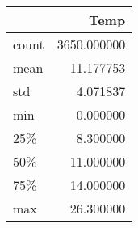 \begin{tabular}{lr}
\toprule
{} &         Temp \\
\midrule
count &  3650.000000 \\
mean  &    11.177753 \\
std   &     4.071837 \\
min   &     0.000000 \\
25\%   &     8.300000 \\
50\%   &    11.000000 \\
75\%   &    14.000000 \\
max   &    26.300000 \\
\bottomrule
\end{tabular}
